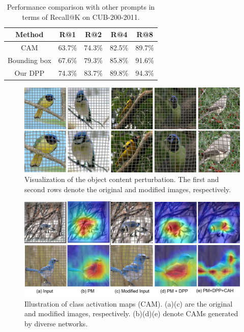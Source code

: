 \documentclass[letterpaper]{article} %
\begin{document}
\begin{table}\centering

\begin{tabular}{c||cccc}
\hline \hline
Method & R@1 & R@2 & R@4 & R@8 \\
\hline
CAM & 63.7\% & 74.3\% & 82.5\%  &89.7\% \\
Bounding box & 67.6\% & 79.3\%& 85.8\%& 91.6\% \\
\hline
Our DPP &74.3\% & 83.7\% & 89.8\% &94.3\% \\
\hline \hline
\end{tabular}
\caption{Performance comparison with other prompts in terms of Recall@K on CUB-200-2011.}
\end{table}




\begin{figure}[!t]
\centering



    \includegraphics[width = 0.9\linewidth]{sample.png}
    \caption{Visualization of the object content perturbation. The first and second rows denote the original and modified images, respectively.}

\end{figure}
\begin{figure}[!t]
\centering
    \includegraphics[width = 0.9\linewidth]{sam.png}
    \caption{ Illustration of class activation maps (CAM). (a)(c) are the original and modified images, respectively. (b)(d)(e) denote CAMs generated by diverse networks.}


\end{figure}
\end{document}
